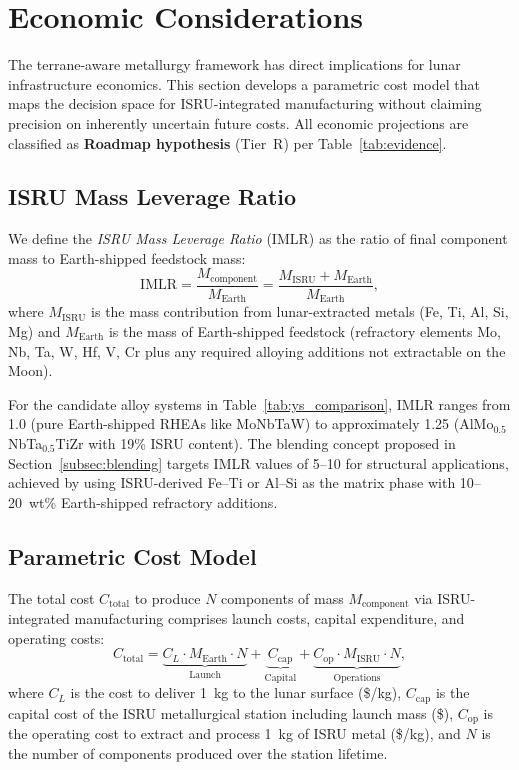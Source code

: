 \documentclass[11pt,a4paper]{article}
\begin{document}
\section{Economic Considerations}
\label{sec:economics}

The terrane-aware metallurgy framework has direct implications for lunar infrastructure economics. This section develops a parametric cost model that maps the decision space for ISRU-integrated manufacturing without claiming precision on inherently uncertain future costs. All economic projections are classified as \textbf{Roadmap hypothesis} (Tier~R) per Table~\ref{tab:evidence}.

\subsection{ISRU Mass Leverage Ratio}
\label{subsec:imlr}

We define the \emph{ISRU Mass Leverage Ratio} (IMLR) as the ratio of final component mass to Earth-shipped feedstock mass:
\begin{equation}
    \text{IMLR} = \frac{M_{\text{component}}}{M_{\text{Earth}}} = \frac{M_{\text{ISRU}} + M_{\text{Earth}}}{M_{\text{Earth}}},
    \label{eq:imlr}
\end{equation}
where $M_{\text{ISRU}}$ is the mass contribution from lunar-extracted metals (Fe, Ti, Al, Si, Mg) and $M_{\text{Earth}}$ is the mass of Earth-shipped feedstock (refractory elements Mo, Nb, Ta, W, Hf, V, Cr plus any required alloying additions not extractable on the Moon).

For the candidate alloy systems in Table~\ref{tab:ys_comparison}, IMLR ranges from 1.0 (pure Earth-shipped RHEAs like MoNbTaW) to approximately 1.25 (AlMo$_{0.5}$NbTa$_{0.5}$TiZr with 19\% ISRU content). The blending concept proposed in Section~\ref{subsec:blending} targets IMLR values of 5--10 for structural applications, achieved by using ISRU-derived Fe--Ti or Al--Si as the matrix phase with 10--20~wt\% Earth-shipped refractory additions.

\subsection{Parametric Cost Model}
\label{subsec:cost_model}

The total cost $C_{\text{total}}$ to produce $N$ components of mass $M_{\text{component}}$ via ISRU-integrated manufacturing comprises launch costs, capital expenditure, and operating costs:
\begin{equation}
    C_{\text{total}} = \underbrace{C_L \cdot M_{\text{Earth}} \cdot N}_{\text{Launch}}
    + \underbrace{C_{\text{cap}}}_{\text{Capital}}
    + \underbrace{C_{\text{op}} \cdot M_{\text{ISRU}} \cdot N}_{\text{Operations}},
    \label{eq:total_cost}
\end{equation}
where $C_L$ is the cost to deliver 1~kg to the lunar surface (\$/kg), $C_{\text{cap}}$ is the capital cost of the ISRU metallurgical station including launch mass (\$), $C_{\text{op}}$ is the operating cost to extract and process 1~kg of ISRU metal (\$/kg), and $N$ is the number of components produced over the station lifetime.
\end{document}
